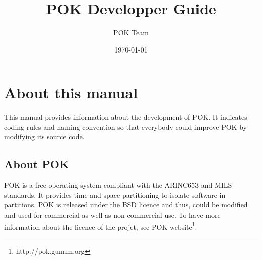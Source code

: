 \documentclass[oneside]{article}
\begin{document}
\title{POK Developper Guide}

\author{POK Team}

\date{\today}


\maketitle

\tableofcontents

\section{About this manual}
This manual provides information about the development of POK. It indicates
coding rules and naming convention so that everybody could improve POK by
modifying its source code.

   \subsection{About POK}
   POK is a free operating system compliant with the ARINC653 and MILS
   standards. It provides time and space partitioning to isolate software in
   partitions. POK is released under the BSD licence and thus, could be modified
   and used for commercial as well as non-commercial use. To have more
   information about the licence of the projet, see POK
   website\footnote{http://pok.gunnm.org}.
\end{document}
